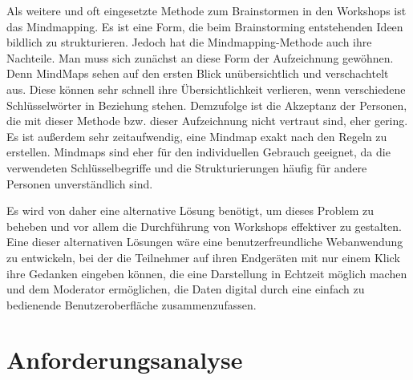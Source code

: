 Als weitere und oft eingesetzte Methode zum Brainstormen in den Workshops ist das Mindmapping. Es ist eine Form, die beim Brainstorming entstehenden Ideen bildlich zu strukturieren. Jedoch hat die Mindmapping-Methode auch ihre Nachteile. Man muss sich zunächst an diese Form der Aufzeichnung gewöhnen. Denn MindMaps sehen auf den ersten Blick unübersichtlich und verschachtelt aus. Diese können sehr schnell ihre Übersichtlichkeit verlieren, wenn verschiedene Schlüsselwörter in Beziehung stehen. Demzufolge ist die Akzeptanz der Personen, die mit dieser Methode bzw. dieser Aufzeichnung nicht vertraut sind, eher gering. Es ist außerdem sehr zeitaufwendig, eine Mindmap exakt nach den Regeln zu erstellen. Mindmaps sind eher für den individuellen Gebrauch geeignet, da die verwendeten Schlüsselbegriffe und die Strukturierungen häufig für andere Personen unverständlich sind.\bigskip

Es wird von daher eine alternative Lösung benötigt, um dieses Problem zu beheben und vor allem die Durchführung von Workshops effektiver zu gestalten. Eine dieser alternativen Lösungen wäre eine benutzerfreundliche Webanwendung zu entwickeln, bei der die Teilnehmer auf ihren Endgeräten mit nur einem \glqq Klick\grqq{} ihre Gedanken eingeben können, die eine Darstellung in Echtzeit möglich machen und dem Moderator ermöglichen, die Daten digital durch eine einfach zu bedienende Benutzeroberfläche zusammenzufassen.

\section{Anforderungsanalyse}
\label{sec:anforderungsanalyse}

